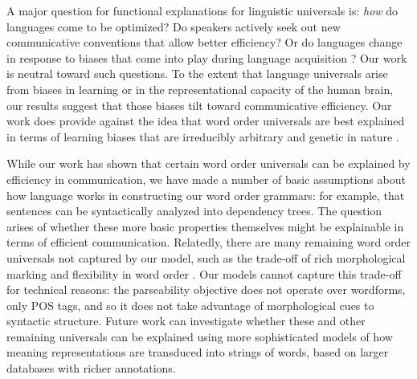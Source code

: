\documentclass[9pt,twocolumn,twoside,lineno]{pnas-new}
\begin{document}
A major question for functional explanations for linguistic universals is: \emph{how} do languages come to be optimized? Do speakers actively seek out new communicative conventions that allow better efficiency? Or do languages change in response to biases that come into play during language acquisition \cite{fedzechkina2012language,culbertson2012learning}? Our work is neutral toward such questions. To the extent that language universals arise from biases in learning or in the representational capacity of the human brain, our results suggest that those biases tilt toward communicative efficiency. Our work does provide against the idea that word order universals are best explained in terms of learning biases that are irreducibly arbitrary and genetic in nature \cite{chomsky2010some}.

While our work has shown that certain word order universals can be explained by efficiency in communication, we have made a number of basic assumptions about how language works in constructing our word order grammars: for example, that sentences can be syntactically analyzed into dependency trees. The question arises of whether these more basic properties themselves might be explainable in terms of efficient communication. Relatedly, there are many remaining word order universals not captured by our model, such as the trade-off of rich morphological marking and flexibility in word order \cite{jespersen1922,mcfadden2003morphological,futrell2015quantifying}. Our models cannot capture this trade-off for technical reasons: the parseability objective does not operate over wordforms, only POS tags, and so it does not take advantage of morphological cues to syntactic structure. Future work can investigate whether these and other remaining universals can be explained using more sophisticated models of how meaning representations are transduced into strings of words, based on larger databases with richer annotations.
\end{document}
